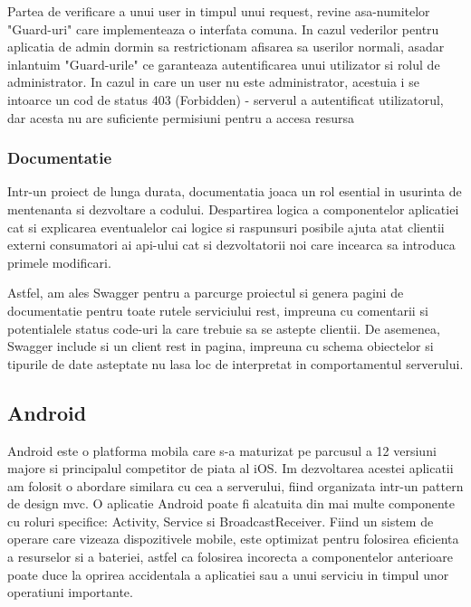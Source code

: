 Partea de verificare a unui user in timpul unui request, revine asa-numitelor "Guard-uri" care implementeaza o interfata comuna. In cazul vederilor pentru aplicatia de admin dormin sa restrictionam afisarea sa userilor normali, asadar inlantuim "Guard-urile" ce garanteaza autentificarea unui utilizator si rolul de administrator. In cazul in care un user nu este administrator, acestuia i se intoarce un cod de status 403 (Forbidden) - serverul a autentificat utilizatorul, dar acesta nu are suficiente permisiuni pentru a accesa resursa

\subsubsection {Documentatie}

Intr-un proiect de lunga durata, documentatia joaca un rol esential in usurinta de mentenanta si dezvoltare a codului. Despartirea logica a componentelor aplicatiei cat si explicarea eventualelor cai logice si raspunsuri posibile ajuta atat clientii externi consumatori ai \acrshort{api}-ului cat si dezvoltatorii noi care incearca sa introduca primele modificari.

Astfel, am ales Swagger pentru a parcurge proiectul si genera pagini de documentatie pentru toate rutele serviciului \acrshort{rest}, impreuna cu comentarii si potentialele status code-uri la care trebuie sa se astepte clientii. De asemenea, Swagger include si un client \acrshort{rest} in pagina, impreuna cu schema obiectelor si tipurile de date asteptate nu lasa loc de interpretat in comportamentul serverului.

\subsection {Android}

Android este o platforma mobila care s-a maturizat pe parcusul a 12 versiuni majore si principalul competitor de piata al iOS. Im dezvoltarea acestei aplicatii am folosit o abordare similara cu cea a serverului, fiind organizata intr-un pattern de design \acrshort{mvc}. O aplicatie Android poate fi alcatuita din mai multe componente cu roluri specifice: Activity, Service si BroadcastReceiver. Fiind un sistem de operare care vizeaza dispozitivele mobile, este optimizat pentru folosirea eficienta a resurselor si a bateriei, astfel ca folosirea incorecta a componentelor anterioare poate duce la oprirea accidentala a aplicatiei sau a unui serviciu in timpul unor operatiuni importante.


